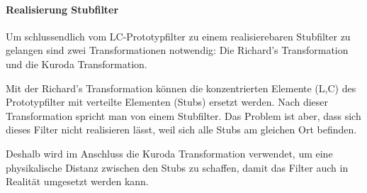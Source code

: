 
\paragraph{Realisierung Stubfilter}

Um schlussendlich vom LC-Prototypfilter zu einem realisierebaren Stubfilter zu gelangen sind zwei Transformationen notwendig: Die Richard's Transformation und die Kuroda Transformation.

Mit der Richard's Transformation können die konzentrierten Elemente (L,C) des Prototypfilter mit verteilte Elementen (Stubs) ersetzt werden. Nach dieser Transformation spricht man von einem Stubfilter. Das Problem ist aber, dass sich dieses Filter nicht realisieren lässt, weil sich alle Stubs am gleichen Ort befinden. 

Deshalb wird im Anschluss die Kuroda Transformation verwendet,  um eine physikalische Distanz zwischen
den  Stubs  zu  schaffen, damit das Filter auch in Realit\"at umgesetzt  werden  kann.

